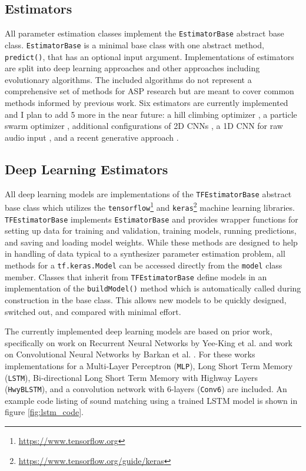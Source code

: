 \subsection{Estimators}
All parameter estimation classes implement the \texttt{EstimatorBase} abstract base class. \texttt{EstimatorBase} is a minimal base class with one abstract method, \texttt{predict()}, that has an optional input argument. Implementations of estimators are split into deep learning approaches and other approaches including evolutionary algorithms.  The included algorithms do not represent a comprehensive set of methods for ASP research but are meant to cover common methods informed by previous work. Six estimators are currently implemented and I plan to add 5 more in the near future: a hill climbing optimizer \cite{yee2018automatic}, a particle swarm optimizer \cite{heise2009automatic}, additional configurations of 2D CNNs \cite{barkan2019inversynth}, a 1D CNN for raw audio input \cite{barkan2019inversynth}, and a recent generative approach \cite{esling2020flow}.

\subsection{Deep Learning Estimators}
All deep learning models are implementations of the \texttt{TFEstimatorBase} abstract base class which utilizes the \texttt{tensorflow}\footnote{\url{https://www.tensorflow.org}} and \texttt{keras}\footnote{\url{https://www.tensorflow.org/guide/keras}} machine learning libraries. \texttt{TFEstimatorBase} implements \texttt{EstimatorBase} and provides wrapper functions for setting up data for training and validation, training models, running predictions, and saving and loading model weights. While these methods are designed to help in handling of data typical to a synthesizer parameter estimation problem, all methods for a \texttt{tf.keras.Model} can be accessed directly from the \texttt{model} class member. Classes that inherit from \texttt{TFEstimatorBase} define models in an implementation of the \texttt{buildModel()} method which is automatically called during construction in the base class. This allows new models to be quickly designed, switched out, and compared with minimal effort.

The currently implemented deep learning models are based on prior work, specifically on work on Recurrent Neural Networks by Yee-King et al. \cite{yee2018automatic} and work on Convolutional Neural Networks by Barkan et al. \cite{barkan2019inversynth}. For these works implementations for a Multi-Layer Perceptron (\texttt{MLP}), Long Short Term Memory (\texttt{LSTM}), Bi-directional Long Short Term Memory with Highway Layers (\texttt{HwyBLSTM}), and a convolution network with 6-layers (\texttt{Conv6}) are included. An example code listing of sound matching using a trained LSTM model is shown in figure \ref{fig:lstm_code}.

